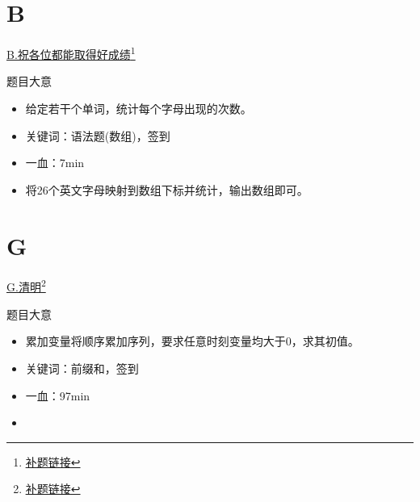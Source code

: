 \documentclass{beamer}
\begin{document}
    \section{B}
    \hypertarget{B}{}
    \begin{frame}{\hyperlink{toc}{B.祝各位都能取得好成绩}\footnote{\href{https://acm816.cn/p/237}{\underline{补题链接}}}}
        \begin{block}{题目大意}
            \begin{itemize}
                \item 给定若干个单词，统计每个字母出现的次数。
                \item 关键词：语法题(数组)，签到
                \item 一血：7min
            \end{itemize}
        \end{block}
        \begin{itemize}
            \item 将26个英文字母映射到数组下标并统计，输出数组即可。
        \end{itemize}
    \end{frame}
    \section{G}
    \hypertarget{G}{}
    \begin{frame}{\hyperlink{toc}{G.清明}\footnote{\href{https://acm816.cn/p/242}{\underline{补题链接}}}}
        \begin{block}{题目大意}
            \begin{itemize}
                \item 累加变量将顺序累加序列，要求任意时刻变量均大于$0$，求其初值。
                \item 关键词：前缀和，签到
                \item 一血：97min
            \end{itemize}
        \end{block}
        \begin{itemize}
            \item 
        \end{itemize}
    \end{frame}
\end{document}
